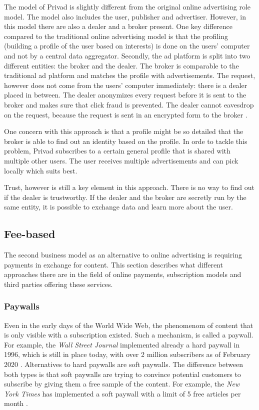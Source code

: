 The model of Privad is slightly different from the original online advertising role model. The model also includes the user, publisher and advertiser. However, in this model there are also a dealer and a broker present. One key difference compared to the traditional online advertising model is that the profiling (building a profile of the user based on interests) is done on the users' computer and not by a central data aggregator. Secondly, the ad platform is split into two different entities: the broker and the dealer. The broker is comparable to the traditional ad platform and matches the profile with advertisements. The request, however does not come from the users' computer immediately: there is a dealer placed in between. The dealer anonymizes every request before it is sent to the broker and makes sure that click fraud is prevented. The dealer cannot eavesdrop on the request, because the request is sent in an encrypted form to the broker \cite{guha2011privad}. 

One concern with this approach is that a profile might be so detailed that the broker is able to find out an identity based on the profile. In orde to tackle this problem, Privad subscribes to a certain general profile that is shared with multiple other users. The user receives multiple advertisements and can pick locally which suits best.

Trust, however is still a key element in this approach. There is no way to find out if the dealer is trustworthy. If the dealer and the broker are secretly run by the same entity, it is possible to exchange data and learn more about the user. 

\subsection{Fee-based}

The second business model as an alternative to online advertising is requiring payments in exchange for content. This section describes what different approaches there are in the field of online payments, subscription models and third parties offering these services.

\subsubsection{Paywalls}

Even in the early days of the World Wide Web, the phenomenom of content that is only visible with a subscription existed. Such a mechanism, is called a paywall. For example, the \textit{Wall Street Journal} implemented already a hard paywall in 1996, which is still in place today, with over 2 million subscribers as of February 2020 \cite{firstpaywall}. 
Alternatives to hard paywalls are soft paywalls. The difference between both types is that soft paywalls are trying to convince potential customers to subscribe by giving them a free sample of the content. For example, the \textit{New York Times} has implemented a soft paywall with a limit of 5 free articles per month \cite{cook2012paying}.

